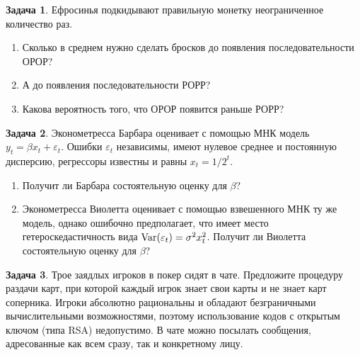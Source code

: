 \documentclass[final,pdftex]{../../template/epsilonj}
\theoremstyle{definition} %
\newtheorem{zadacha}{Задача}
\begin{document}
\begin{zadacha}
Ефросинья подкидывают правильную монетку неограниченное количество раз. 

\begin{enumerate}
\item Сколько в среднем нужно сделать бросков до появления последовательности ОРОР? 
\item А до появления последовательности РОРР?
\item Какова вероятность того, что ОРОР появится раньше РОРР?
\end{enumerate}

\end{zadacha}

\begin{zadacha}
Эконометресса Барбара оценивает с помощью МНК модель $y_t=\beta x_t+\varepsilon_t$. Ошибки $\varepsilon_t$ независимы, имеют нулевое среднее и постоянную дисперсию, регрессоры известны и равны $x_t=1/2^t$. 
\begin{enumerate}
\item Получит ли Барбара состоятельную оценку для $\beta$?
\item Эконометресса Виолетта оценивает с помощью взвешенного МНК ту же модель, однако ошибочно предполагает, что имеет место гетероскедастичность вида $\operatorname{Var}(\varepsilon_t)=\sigma^2 x_t^2$. Получит ли Виолетта состоятельную оценку для $\beta$?
\end{enumerate}
\end{zadacha}

\begin{zadacha}
Трое заядлых игроков в покер сидят в чате. Предложите процедуру раздачи карт, при которой каждый игрок знает свои карты и не знает карт соперника. Игроки абсолютно рациональны и обладают безграничными вычислительными возможностями, поэтому использование кодов с открытым ключом (типа RSA) недопустимо. В чате можно посылать сообщения, адресованные как всем сразу, так и конкретному лицу.
\end{zadacha}


\printbibliography
\end{document}
